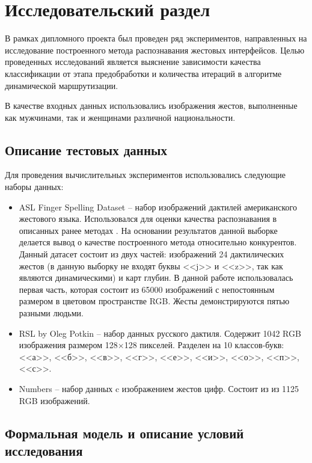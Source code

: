 \chapter{Исследовательский раздел}
\label{cha:research}

В рамках дипломного проекта был проведен ряд экспериментов, направленных на исследование построенного метода распознавания жестовых интерфейсов. Целью проведенных исследований является выяснение зависимости качества классификации от этапа предобработки и количества итераций в алгоритме динамической маршрутизации.

В качестве входных данных использовались изображения жестов, выполненные как мужчинами, так и женщинами различной национальности.

\section{Описание тестовых данных}

Для проведения вычислительных экспериментов использовались следующие наборы данных:

\begin{itemize}
	\item ASL Finger Spelling Dataset -- набор изображений дактилей американского жестового языка. Использовался для оценки качества распознавания в описанных ранее методах \cite{Karn,Starner,Garcia}. На основании результатов данной выборке делается вывод о качестве построенного метода относительно конкурентов. Данный датасет состоит из двух частей: изображений 24 дактилических жестов (в данную выборку не входят буквы <<j>> и <<z>>, так как являются динамическими) и карт глубин. В данной работе использовалась первая часть, которая состоит из 65000 изображений с непостоянным размером в цветовом пространстве RGB. Жесты демонстрируются пятью разными людьми.
	\item RSL by Oleg Potkin -- набор данных русского дактиля. Содержит 1042 RGB изображения размером 128$\times$128 пикселей. Разделен на 10 классов-букв: <<а>>, <<б>>, <<в>>, <<г>>, <<е>>, <<и>>, <<о>>, <<п>>, <<с>>.
	\item Numbers -- набор данных c изображением жестов цифр. Состоит из из 1125 RGB изображений.
\end{itemize}

\section{Формальная модель и описание условий исследования}

